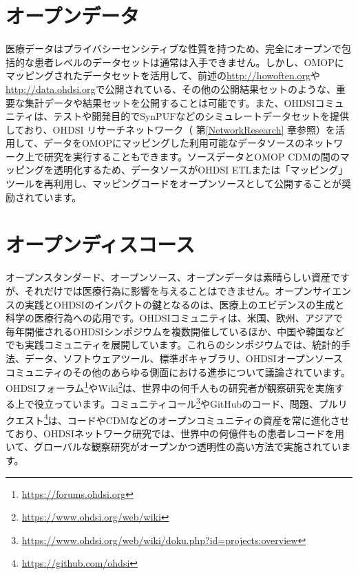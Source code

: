 \documentclass[
  11pt]{book}
\theoremstyle{definition}
\theoremstyle{definition}
\theoremstyle{definition}
\theoremstyle{definition}
\theoremstyle{remark}
\begin{document}
\section{オープンデータ}\label{ux30aaux30fcux30d7ux30f3ux30c7ux30fcux30bf}


医療データはプライバシーセンシティブな性質を持つため、完全にオープンで包括的な患者レベルのデータセットは通常は入手できません。しかし、OMOPにマッピングされたデータセットを活用して、前述の\url{http://howoften.org}や\url{http://data.ohdsi.org}で公開されている、その他の公開結果セットのような、重要な集計データや結果セットを公開することは可能です。また、OHDSIコミュニティは、テストや開発目的でSynPUFなどのシミュレートデータセットを提供しており、OHDSI リサーチネットワーク（ 第\ref{NetworkResearch} 章参照）を活用して、データをOMOPにマッピングした利用可能なデータソースのネットワーク上で研究を実行することもできます。ソースデータとOMOP CDMの間のマッピングを透明化するため、データソースがOHDSI ETLまたは「マッピング」ツールを再利用し、マッピングコードをオープンソースとして公開することが奨励されています。

\section{オープンディスコース}\label{ux30aaux30fcux30d7ux30f3ux30c7ux30a3ux30b9ux30b3ux30fcux30b9}


オープンスタンダード、オープンソース、オープンデータは素晴らしい資産ですが、それだけでは医療行為に影響を与えることはできません。オープンサイエンスの実践とOHDSIのインパクトの鍵となるのは、医療上のエビデンスの生成と科学の医療行為への応用です。OHDSIコミュニティは、米国、欧州、アジアで毎年開催されるOHDSIシンポジウムを複数開催しているほか、中国や韓国などでも実践コミュニティを展開しています。これらのシンポジウムでは、統計的手法、データ、ソフトウェアツール、標準ボキャブラリ、OHDSIオープンソースコミュニティのその他のあらゆる側面における進歩について議論されています。OHDSIフォーラム\footnote{\url{https://forums.ohdsi.org}}やWiki\footnote{\url{https://www.ohdsi.org/web/wiki}}は、世界中の何千人もの研究者が観察研究を実施する上で役立っています。コミュニティコール\footnote{\url{https://www.ohdsi.org/web/wiki/doku.php?id=projects:overview}}やGitHubのコード、問題、プルリクエスト\footnote{\url{https://github.com/ohdsi}}は、コードやCDMなどのオープンコミュニティの資産を常に進化させており、OHDSIネットワーク研究では、世界中の何億件もの患者レコードを用いて、グローバルな観察研究がオープンかつ透明性の高い方法で実施されています。
\end{document}
